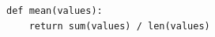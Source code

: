 \documentclass{article}
\begin{document}
\begin{verbatim}
def mean(values):
    return sum(values) / len(values)
\end{verbatim}
\end{document}
